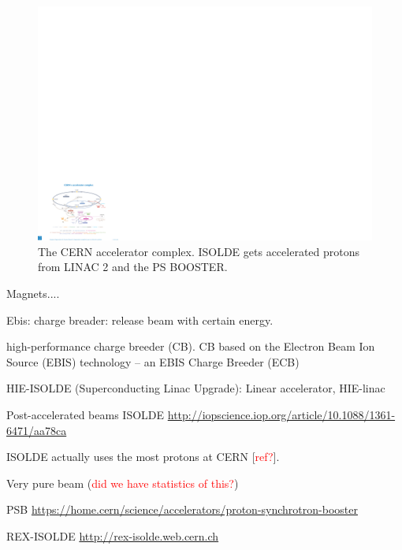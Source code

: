 \documentclass[twoside,english]{uiofysmaster/uiofysmaster}
\begin{document}
\begin{figure}[t]
	\centering
	\includegraphics[width=\textwidth]{images/0812015.pdf}
	\caption{The CERN accelerator complex. ISOLDE gets accelerated protons from LINAC 2 and the PS BOOSTER.}
	\label{fig:accelerators}
\end{figure}

\bigskip

Magnets....

\bigskip

Ebis: charge breader: release beam with certain energy.


high-performance charge breeder (CB). CB based on the Electron Beam Ion Source (EBIS) technology – an EBIS Charge Breeder (ECB)


\bigskip

HIE-ISOLDE (Superconducting Linac Upgrade): Linear accelerator, HIE-linac \newline

\bigskip

Post-accelerated beams ISOLDE \url{http://iopscience.iop.org/article/10.1088/1361-6471/aa78ca}

\bigskip

ISOLDE actually uses the most protons at CERN [\textcolor{red}{ref?}].

\bigskip

Very pure beam (\textcolor{red}{did we have statistics of this?})

\bigskip

PSB \url{https://home.cern/science/accelerators/proton-synchrotron-booster}

\bigskip

REX-ISOLDE \url{http://rex-isolde.web.cern.ch}
\end{document}
